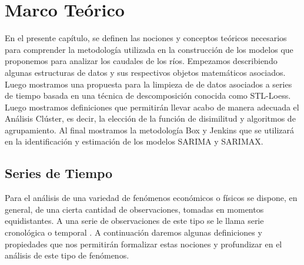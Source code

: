 \documentclass[12pt,oneside]{book}\usepackage[]{graphicx}\usepackage[]{color}
\theoremstyle{definition} %
\begin{document}
\chapter{Marco Teórico}






En el presente capítulo, se definen las nociones y conceptos teóricos necesarios para comprender la metodología utilizada en la construcción de los modelos que proponemos para analizar los caudales de los ríos. Empezamos describiendo algunas estructuras de datos y sus respectivos objetos matemáticos asociados. Luego mostramos una propuesta para la limpieza de de datos asociados a series de tiempo basada en una técnica de descomposición conocida como STL-Loess. Luego mostramos definiciones que permitirán llevar acabo de manera adecuada el Análisis Clúster, es decir, la elección de la función de disimilitud y algoritmos de agrupamiento. Al final mostramos la metodología Box y Jenkins que se utilizará en la identificación y estimación de los modelos SARIMA y SARIMAX.


\section{Series de Tiempo}

Para el análisis de una variedad de fenómenos económicos o físicos se dispone, en general, de una cierta cantidad de observaciones, tomadas en momentos equidistantes. A una serie de observaciones de este tipo se le llama serie cronológica o temporal \cite{capa2016seriest}.
A continuación daremos algunas definiciones y propiedades que nos permitirán formalizar estas nociones y profundizar en el análisis de este tipo de fenómenos.
\end{document}
